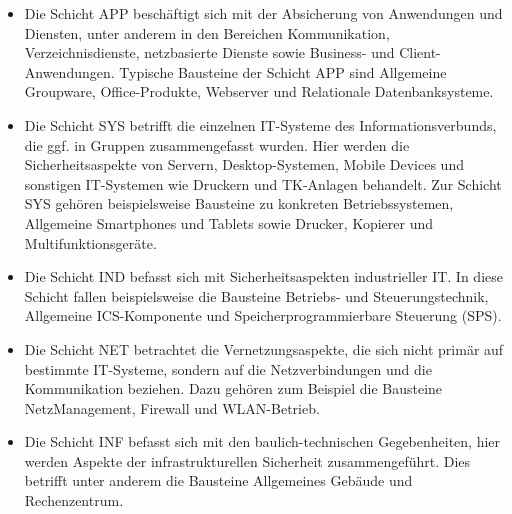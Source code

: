 {\begin{itemize}
	\item Die Schicht APP beschäftigt sich mit der Absicherung von Anwendungen und Diensten, unter anderem in den
	Bereichen Kommunikation, Verzeichnisdienste, netzbasierte Dienste sowie Business- und Client-Anwendungen.
	Typische Bausteine der Schicht APP sind Allgemeine Groupware, Office-Produkte, Webserver und Relationale
	Datenbanksysteme.
	\item Die Schicht SYS betrifft die einzelnen IT-Systeme des Informationsverbunds, die ggf. in Gruppen zusammengefasst wurden. Hier werden die Sicherheitsaspekte von Servern, Desktop-Systemen, Mobile Devices und sonstigen IT-Systemen wie Druckern und TK-Anlagen behandelt. Zur Schicht SYS gehören beispielsweise Bausteine zu
	konkreten Betriebssystemen, Allgemeine Smartphones und Tablets sowie Drucker, Kopierer und Multifunktionsgeräte.
	\item Die Schicht IND befasst sich mit Sicherheitsaspekten industrieller IT. In diese Schicht fallen beispielsweise die Bausteine Betriebs- und Steuerungstechnik, Allgemeine ICS-Komponente und Speicherprogrammierbare Steuerung (SPS).
	\item Die Schicht NET betrachtet die Vernetzungsaspekte, die sich nicht primär auf bestimmte IT-Systeme, sondern
	auf die Netzverbindungen und die Kommunikation beziehen. Dazu gehören zum Beispiel die Bausteine NetzManagement, Firewall und WLAN-Betrieb.
	\item Die Schicht INF befasst sich mit den baulich-technischen Gegebenheiten, hier werden Aspekte der infrastrukturellen Sicherheit zusammengeführt. Dies betrifft unter anderem die Bausteine Allgemeines Gebäude und Rechenzentrum.
\end{itemize}}\autocite[][S.\,23-24]{bundesamt_fur_sicherheit_in_der_informationstechnik_bsi_it-grundschutz-kompendium_2020}


